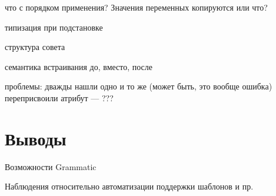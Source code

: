 что с порядком применения? Значения переменных копируются или что?

типизация при подстановке

структура совета

семантика встраивания до, вместо, после

проблемы: 
	дважды нашли одно и то же (может быть, это вообще ошибка)
	переприсвоили атрибут --- ???
	
\chapter{Выводы}

Возможности Grammatic

Наблюдения относительно автоматизации поддержки шаблонов и пр.